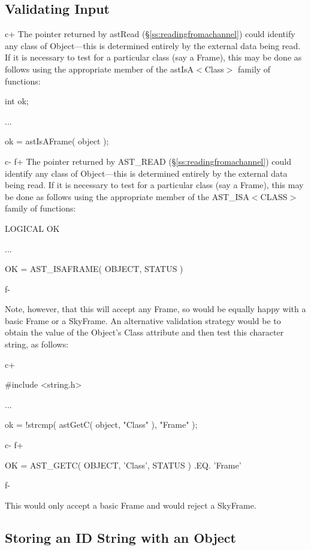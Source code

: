 \documentclass[twoside,11pt]{starlink}
\providecommand{\secref}[1]{\S\ref{#1}}
\begin{document}
{\subsection{\label{ss:validatinginput}Validating Input}

c+
The pointer returned by astRead (\secref{ss:readingfromachannel}) could
identify any class of Object---this is determined entirely by the
external data being read. If it is necessary to test for a particular
class (say a Frame), this may be done as follows using the appropriate
member of the astIsA$<$Class$>$ family of functions:

\small
\begin{terminalv}
int ok;

...

ok = astIsAFrame( object );
\end{terminalv}
\normalsize
c-
f+
The pointer returned by AST\_READ (\secref{ss:readingfromachannel})
could identify any class of Object---this is determined entirely by
the external data being read. If it is necessary to test for a
particular class (say a Frame), this may be done as follows using the
appropriate member of the AST\_ISA$<$CLASS$>$ family of functions:

\small
\begin{terminalv}
      LOGICAL OK

      ...

      OK = AST_ISAFRAME( OBJECT, STATUS )
\end{terminalv}
\normalsize
f-

Note, however, that this will accept any Frame, so would be equally
happy with a basic Frame or a SkyFrame.  An alternative validation
strategy would be to obtain the value of the Object's Class attribute
and then test this character string, as follows:

c+
\small
\begin{terminalv}
#include <string.h>

...

ok = !strcmp( astGetC( object, "Class" ), "Frame" );
\end{terminalv}
\normalsize
c-
f+
\small
\begin{terminalv}
      OK = AST_GETC( OBJECT, 'Class', STATUS ) .EQ. 'Frame'
\end{terminalv}
\normalsize
f-

This would only accept a basic Frame and would reject a SkyFrame.

\subsection{Storing an ID String with an Object}

}
\end{document}
